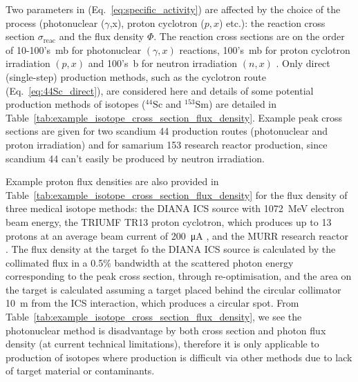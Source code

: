 \documentclass[../main.tex]{subfiles}
\begin{document}
Two parameters in (Eq.~\ref{eq:specific_activity}) are affected by the choice of the process (photonuclear ($\gamma$,x), proton cyclotron ($p,x$) etc.): the reaction cross section $\sigma_{\mathrm{reac}}$ and the flux density $\Phi$. The reaction cross sections are on the order of 10-100's~\si{\milli\barn} for photonuclear $\left(\gamma,x\right)$ reactions, 100's~\si{\milli\barn} for proton cyclotron irradiation $\left(p,x\right)$ and 100's~\si{\barn} for neutron irradiation $\left(n,x\right)$ \cite{zerkin2018experimental}. Only direct (single-step) production methods, such as the cyclotron route (Eq.~\ref{eq:44Sc_direct}), are considered here and details of some potential production methods of isotopes ($^{44}\mathrm{Sc}$ and $^{153}\mathrm{Sm}$) are detailed in Table~\ref{tab:example_isotope_cross_section_flux_density}. Example peak cross sections are given for two scandium 44 production routes (photonuclear and proton irradiation) and for samarium 153 research reactor production, since scandium 44 can't easily be produced by neutron irradiation.

Example proton flux densities are also provided in Table~\ref{tab:example_isotope_cross_section_flux_density} for the flux density of three medical isotope methods: the DIANA ICS source with 1072~\si{\mega\electronvolt} electron beam energy, the TRIUMF TR13 proton cyclotron, which produces up to 13~\si{\mega\lectronvolt} protons at an average beam current of 200~\si{\micro\ampere} \cite{hoehr2017medical,laxdale1994beam}, and the MURR research reactor \cite{ma1996production}. The flux density at the target fo the DIANA ICS source is calculated by the collimated flux in a 0.5\% bandwidth at the scattered photon energy corresponding to the peak cross section, through re-optimisation, and the area on the target is calculated assuming a target placed behind the circular collimator 10~\si{\meter} from the ICS interaction, which produces a circular spot. From Table~\ref{tab:example_isotope_cross_section_flux_density}, we see the photonuclear method is disadvantage by both cross section and photon flux density (at current technical limitations), therefore it is only applicable to production of isotopes where production is difficult via other methods due to lack of target material or contaminants.
\end{document}
